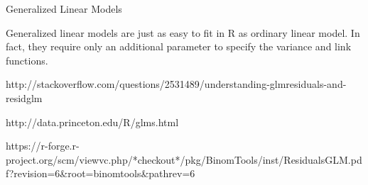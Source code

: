 Generalized Linear Models

Generalized linear models are just as easy to fit in R as ordinary linear model. In fact, they require only an additional parameter to specify the variance and link functions.
 
 
http://stackoverflow.com/questions/2531489/understanding-glmresiduals-and-residglm

http://data.princeton.edu/R/glms.html

https://r-forge.r-project.org/scm/viewvc.php/*checkout*/pkg/BinomTools/inst/ResidualsGLM.pdf?revision=6&root=binomtools&pathrev=6
